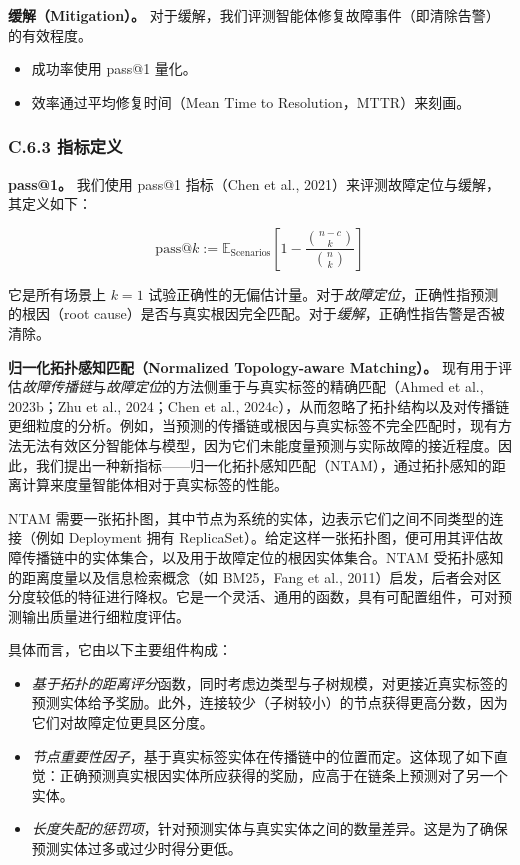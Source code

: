 \textbf{缓解（Mitigation）。} 对于缓解，我们评测智能体修复故障事件（即清除告警）的有效程度。

\begin{itemize}
\item 成功率使用 pass@1 量化。
\item 效率通过平均修复时间（Mean Time to Resolution，MTTR）来刻画。
\end{itemize}

\subsubsection{C.6.3 指标定义}

\textbf{pass@1。} 我们使用 pass@1 指标（Chen et al., 2021）来评测故障定位与缓解，其定义如下：

\begin{equation}
\mathrm{pass@}k := \mathbb{E}_{\mathrm{Scenarios}}\left[ 1 - \frac{\binom{n-c}{k}}{\binom{n}{k}} \right]
\end{equation}

它是所有场景上 $k=1$ 试验正确性的无偏估计量。对于\emph{故障定位}，正确性指预测的根因（root cause）是否与真实根因完全匹配。对于\emph{缓解}，正确性指告警是否被清除。

\textbf{归一化拓扑感知匹配（Normalized Topology-aware Matching）。} 现有用于评估\emph{故障传播链}与\emph{故障定位}的方法侧重于与真实标签的精确匹配（Ahmed et al., 2023b；Zhu et al., 2024；Chen et al., 2024c），从而忽略了拓扑结构以及对传播链更细粒度的分析。例如，当预测的传播链或根因与真实标签不完全匹配时，现有方法无法有效区分智能体与模型，因为它们未能度量预测与实际故障的接近程度。因此，我们提出一种新指标——归一化拓扑感知匹配（NTAM），通过拓扑感知的距离计算来度量智能体相对于真实标签的性能。

NTAM 需要一张拓扑图，其中节点为系统的实体，边表示它们之间不同类型的连接（例如 Deployment 拥有 ReplicaSet）。给定这样一张拓扑图，便可用其评估故障传播链中的实体集合，以及用于故障定位的根因实体集合。NTAM 受拓扑感知的距离度量以及信息检索概念（如 BM25，Fang et al., 2011）启发，后者会对区分度较低的特征进行降权。它是一个灵活、通用的函数，具有可配置组件，可对预测输出质量进行细粒度评估。

具体而言，它由以下主要组件构成：

\begin{itemize}
\item \emph{基于拓扑的距离评分}函数，同时考虑边类型与子树规模，对更接近真实标签的预测实体给予奖励。此外，连接较少（子树较小）的节点获得更高分数，因为它们对故障定位更具区分度。
\item \emph{节点重要性因子}，基于真实标签实体在传播链中的位置而定。这体现了如下直觉：正确预测真实根因实体所应获得的奖励，应高于在链条上预测对了另一个实体。
\item \emph{长度失配的惩罚项}，针对预测实体与真实实体之间的数量差异。这是为了确保预测实体过多或过少时得分更低。
\end{itemize}

